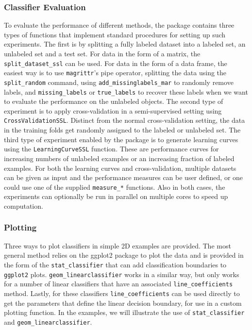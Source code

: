 \documentclass[twoside]{memoir}\usepackage[]{graphicx}\usepackage{xcolor}
\renewcommand{\cite}{\citep}
\begin{document}
\subsubsection{Classifier Evaluation}
To evaluate the performance of different methods, the package contains three types of functions that implement standard procedures for setting up such experiments. The first is by splitting a fully labeled dataset into a labeled set, an unlabeled set and a test set. For data in the form of a matrix, the \texttt{split\_dataset\_ssl} can be used. For data in the form of a data frame, the easiest way is to use \texttt{magrittr}'s pipe operator, splitting the data using the \texttt{split\_random} command, using \texttt{add\_missinglabels\_mar} to randomly remove labels, and \texttt{missing\_labels} or \texttt{true\_labels} to recover these labels when we want to evaluate the performance on the unlabeled objects.
The second type of experiment is to apply cross-validation in a semi-supervised setting using \texttt{CrossValidationSSL}. Distinct from the normal cross-validation setting, the data in the training folds get randomly assigned to the labeled or unlabeled set.
The third type of experiment enabled by the package is to generate learning curves using the \texttt{LearningCurveSSL} function. These are performance curves for increasing numbers of unlabeled examples or an increasing fraction of labeled examples. 
For both the learning curves and cross-validation, multiple datasets can be given as input and the performance measures can be user defined, or one could use one of the supplied \texttt{measure\_*} functions. Also in both cases, the experiments can optionally be run in parallel on multiple cores to speed up computation.

\subsubsection{Plotting}
Three ways to plot classifiers in simple 2D examples are provided. The most general method relies on the ggplot2 package \cite{Wickham2009} to plot the data and is provided in the form of the \texttt{stat\_classifier} that can add  classification boundaries to \texttt{ggplot2} plots. \texttt{geom\_linearclassifier} works in a similar way, but only works for a number of linear classifiers that have an associated \texttt{line\_coefficients} method. Lastly, for these classifiers \texttt{line\_coefficients} can be used directly to get the parameters that define the linear decision boundary, for use in a custom plotting function. In the examples, we will illustrate the use of \texttt{stat\_classifier} and \texttt{geom\_linearclassifier}.
\end{document}
